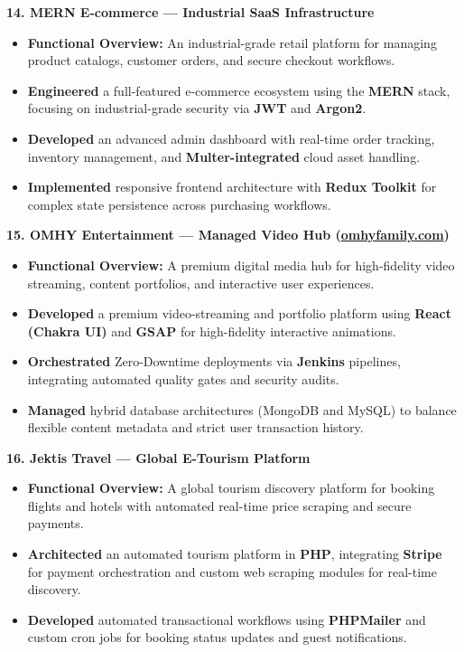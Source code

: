 \documentclass[10pt, letterpaper]{article}
\newenvironment{highlights}{
\begin{itemize}[leftmargin=12pt, itemsep=2pt]
}{
\end{itemize}
}
\begin{document}
\textbf{14. MERN E-commerce --- Industrial SaaS Infrastructure}
\begin{highlights}
\item \textbf{Functional Overview:} An industrial-grade retail platform for managing product catalogs, customer orders, and secure checkout workflows.
\item \textbf{Engineered} a full-featured e-commerce ecosystem using the \textbf{MERN} stack, focusing on industrial-grade security via \textbf{JWT} and \textbf{Argon2}.
\item \textbf{Developed} an advanced admin dashboard with real-time order tracking, inventory management, and \textbf{Multer-integrated} cloud asset handling.
\item \textbf{Implemented} responsive frontend architecture with \textbf{Redux Toolkit} for complex state persistence across purchasing workflows.
\end{highlights}

\textbf{15. OMHY Entertainment --- Managed Video Hub (\href{https://www.omhyfamily.com/}{omhyfamily.com})}
\begin{highlights}
\item \textbf{Functional Overview:} A premium digital media hub for high-fidelity video streaming, content portfolios, and interactive user experiences.
\item \textbf{Developed} a premium video-streaming and portfolio platform using \textbf{React (Chakra UI)} and \textbf{GSAP} for high-fidelity interactive animations.
\item \textbf{Orchestrated} Zero-Downtime deployments via \textbf{Jenkins} pipelines, integrating automated quality gates and security audits.
\item \textbf{Managed} hybrid database architectures (MongoDB and MySQL) to balance flexible content metadata and strict user transaction history.
\end{highlights}

\textbf{16. Jektis Travel --- Global E-Tourism Platform}
\begin{highlights}
\item \textbf{Functional Overview:} A global tourism discovery platform for booking flights and hotels with automated real-time price scraping and secure payments.
\item \textbf{Architected} an automated tourism platform in \textbf{PHP}, integrating \textbf{Stripe} for payment orchestration and custom web scraping modules for real-time discovery.
\item \textbf{Developed} automated transactional workflows using \textbf{PHPMailer} and custom cron jobs for booking status updates and guest notifications.
\end{highlights}
\end{document}
